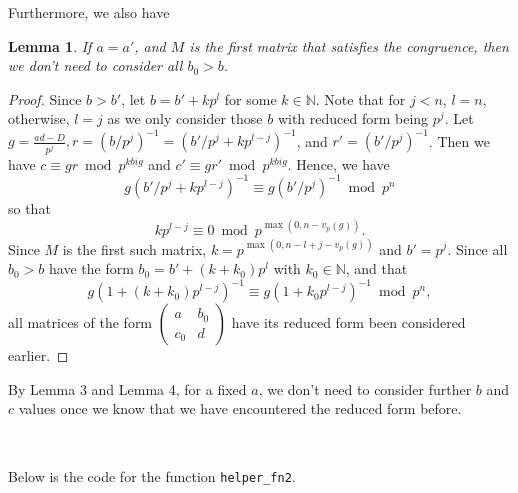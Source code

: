 \documentclass[letterpaper,12pt]{article}
\newtheorem{lemma}{Lemma}
\begin{document}
Furthermore, we also have 
\begin{lemma}
If $a = a'$, and $M$ is the first matrix that satisfies the congruence,
then we don't need to consider all $b_0 > b$. 
\end{lemma}
\begin{proof}
Since $b > b'$, let $b = b' + k p^l$ for some $k \in \mathbb{N}$.
Note that for $j < n$, $l = n$, otherwise, $l = j$ as we only consider those 
$b$ with reduced form being $p^j$.
Let $g = \frac{ad-D}{p^j}, r = (b / p^j)^{-1} = (b' / p^j + kp^{l-j})^{-1}$, and 
$r' = (b' / p^j)^{-1}$.
Then we have $c \equiv gr \bmod p^{kbig}$ and $c' \equiv gr' \bmod p^{kbig}$.
Hence, we have
\[
g(b' / p^j + kp^{l-j})^{-1} \equiv g(b' / p^j)^{-1} \bmod p^n
\]
so that 
\[
kp^{l-j} \equiv 0 \bmod p^{\max(0, n - v_p(g))}.
\]
Since $M$ is the first such matrix, $k = p^{\max(0, n-l+j - v_p(g))}$
and $b' = p^j$. 
Since all $b_0 > b$ have the form $b_0 = b'+ (k+k_0)p^l$ with $k_0 \in \mathbb{N}$,
and that 
\[
g(1 + (k+ k_0)p^{l-j})^{-1} \equiv g(1 + k_0p^{l-j})^{-1} \bmod p^n,
\]
all matrices of the form 
$\begin{pmatrix} a & b_0 \\ c_0 & d \end{pmatrix}$
have its reduced form been considered earlier.

\end{proof}

By Lemma 3 and Lemma 4, for a fixed $a$, we don't need 
to consider further $b$ and $c$ values once we know that we 
have encountered the reduced form before.

\

Below is the code for the function \texttt{helper\_fn2}.
\end{document}
